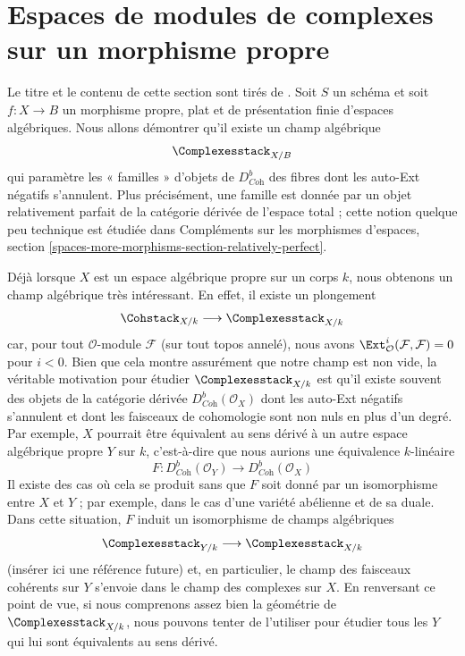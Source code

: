 \section{Espaces de modules de complexes sur un morphisme propre}
\label{section-moduli-complexes}

\noindent
Le titre et le contenu de cette section sont tirés de
\cite{lieblich-complexes}. Soit $S$ un schéma et soit
$f : X \to B$ un morphisme propre, plat et de présentation finie d'espaces
algébriques. Nous allons démontrer qu'il existe un champ algébrique
$$
\Complexesstack_{X/B}
$$
qui paramètre les « familles » d'objets de $D^b_{\textit{Coh}}$ des fibres
dont les auto-Ext négatifs s'annulent. Plus précisément, une famille est donnée
par un objet relativement parfait de la catégorie dérivée de l'espace total ;
cette notion quelque peu technique est étudiée dans
Compléments sur les morphismes d'espaces, section
\ref{spaces-more-morphisms-section-relatively-perfect}.

\medskip\noindent
Déjà lorsque $X$ est un espace algébrique propre sur un corps $k$, nous
obtenons un champ algébrique très intéressant. En effet, il existe un
plongement
$$
\Cohstack_{X/k} \longrightarrow \Complexesstack_{X/k}
$$
car, pour tout $\mathcal{O}$-module $\mathcal{F}$ (sur tout topos annelé),
nous avons $\Ext^i_\mathcal{O}(\mathcal{F}, \mathcal{F}) = 0$ pour $i < 0$.
Bien que cela montre assurément que notre champ est non vide, la véritable
motivation pour étudier $\Complexesstack_{X/k}$ est qu'il existe souvent des
objets de la catégorie dérivée $D^b_{\textit{Coh}}(\mathcal{O}_X)$ dont les
auto-Ext négatifs s'annulent et dont les faisceaux de cohomologie sont non nuls
en plus d'un degré.
Par exemple, $X$ pourrait être équivalent au sens dérivé à un autre espace
algébrique propre $Y$ sur $k$, c'est-à-dire que nous aurions une équivalence
$k$-linéaire
$$
F : D^b_{\textit{Coh}}(\mathcal{O}_Y)
\longrightarrow
D^b_{\textit{Coh}}(\mathcal{O}_X)
$$
Il existe des cas où cela se produit sans que $F$ soit donné par un
isomorphisme entre $X$ et $Y$ ; par exemple, dans le cas d'une variété
abélienne et de sa duale. Dans cette situation, $F$ induit un isomorphisme de
champs algébriques
$$
\Complexesstack_{Y/k}
\longrightarrow
\Complexesstack_{X/k}
$$
(insérer ici une référence future) et, en particulier, le champ des faisceaux
cohérents sur $Y$ s'envoie dans le champ des complexes sur $X$. En renversant
ce point de vue, si nous comprenons assez bien la géométrie de
$\Complexesstack_{X/k}$, nous pouvons tenter de l'utiliser pour étudier tous
les $Y$ qui lui sont équivalents au sens dérivé.

